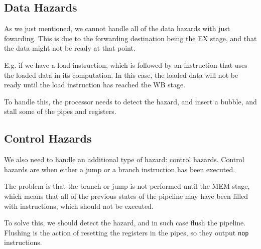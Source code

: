 \documentclass{beamer}
\begin{document}
\subsection{Data Hazards}
\begin{frame}
    As we just mentioned, we cannot handle all of the data hazards with just
    fowarding. This is due to the forwarding destination being the EX stage,
    and that the data might not be ready at that point.

    \vspace{\baselineskip}
    E.g. if we have a load instruction, which is followed by an instruction
    that uses the loaded data in its computation. In this case, the loaded data
    will not be ready until the load instruction has reached the WB stage.

    \vspace{\baselineskip}
    To handle this, the processor needs to detect the hazard, and insert a
    bubble, and stall some of the pipes and registers.
\end{frame}

\subsection{Control Hazards}
\begin{frame}
    We also need to handle an additional type of hazard: control hazards.
    Control hazards are when either a jump or a branch instruction has been
    executed.

    \vspace{\baselineskip}
    The problem is that the branch or jump is not performed until the MEM
    stage, which means that all of the previous states of the pipeline may have
    been filled with instructions, which should not be executed.

    \vspace{\baselineskip}
    To solve this, we should detect the hazard, and in such case flush the
    pipeline. Flushing is the action of resetting the registers in the pipes,
    so they output \texttt{nop} instructions.
\end{frame}
\end{document}
